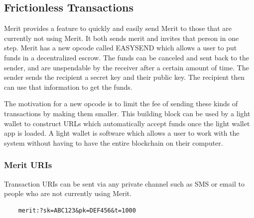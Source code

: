 \documentclass{article}
\begin{document}
\subsection{Frictionless Transactions}

Merit provides a feature to quickly and easily send Merit to those that are
currently not using Merit. It both sends merit and invites that person in one
step. Merit has a new opcode called EASYSEND which allows a user to put funds 
in a decentralized escrow. The funds can be canceled and sent back to the sender,
and are unspendable by the receiver after a certain amount of time. The sender
sends the recipient a secret key and their public key. The recipient then can
use that information to get the funds.

\begin{center}
\end{center}

The motivation for a new opcode is to limit the fee of sending these kinds of
transactions by making them smaller. This building block can be used by
a light wallet to construct URLs which automatically accept funds once
the light wallet app is loaded. A light wallet is software which allows a user
to work with the system without having to have the entire blockchain on their
computer.

\subsubsection{Merit URIs}
Transaction URIs can be sent via any private channel such as SMS or email to people
who are not currently using Merit.
   
\begin{verbatim}
    merit:?sk=ABC123&pk=DEF456&t=1000
\end{verbatim}
\end{document}

